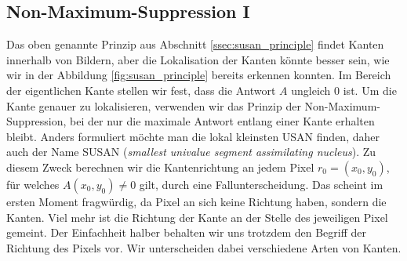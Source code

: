 \documentclass[a4paper, 11pt]{report}
\renewcommand{\emph}[1]{\textit{#1}}
\theoremstyle{definition}
\begin{document}
		\subsection{Non-Maximum-Suppression I}\label{ssec:nonmax}
			Das oben genannte Prinzip aus Abschnitt \ref{ssec:susan_principle} findet Kanten innerhalb von Bildern, aber die Lokalisation der Kanten könnte besser sein, wie wir in der Abbildung \ref{fig:susan_principle} bereits erkennen konnten. Im Bereich der eigentlichen Kante stellen wir fest, dass die Antwort $A$ ungleich $0$ ist. Um die Kante genauer zu lokalisieren, verwenden wir das Prinzip der Non-Maximum-Suppression, bei der nur die maximale Antwort entlang einer Kante erhalten bleibt. Anders formuliert möchte man die lokal kleinsten USAN finden, daher auch der Name SUSAN (\emph{smallest univalue segment assimilating nucleus}).
			Zu diesem Zweck berechnen wir die Kantenrichtung an jedem Pixel $r_0 = (x_0, y_0)$, für welches $A(x_0, y_0) \neq 0$ gilt, durch eine Fallunterscheidung. Das scheint im ersten Moment fragwürdig, da Pixel an sich keine Richtung haben, sondern die Kanten. Viel mehr ist die Richtung der Kante an der Stelle des jeweiligen Pixel gemeint. Der Einfachheit halber behalten wir uns trotzdem den Begriff der Richtung des Pixels vor. Wir unterscheiden dabei verschiedene Arten von Kanten.
\end{document}
